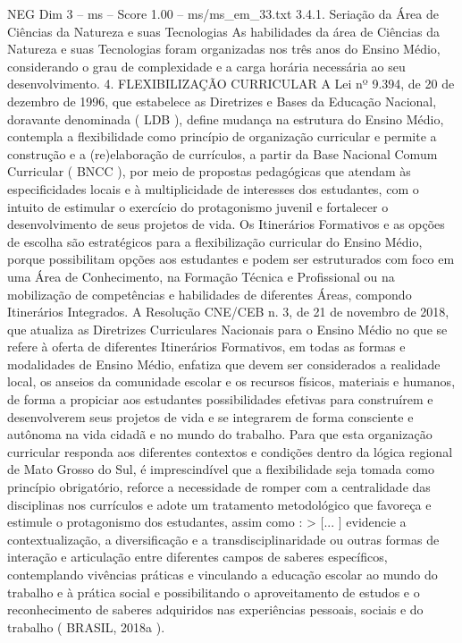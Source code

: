 \begin{textsample}{NEG Dim 3 – ms – Score 1.00 – ms/ms\_em\_33.txt}  \label{ex:f3_neg_096}
3.4.1.
Seriação da Área de Ciências da Natureza e suas Tecnologias As habilidades da área de Ciências da Natureza e suas Tecnologias foram organizadas nos três anos do Ensino Médio, considerando o grau de complexidade e a carga horária necessária ao seu desenvolvimento. 4.
FLEXIBILIZAÇÃO CURRICULAR A Lei nº 9.394, de 20 de dezembro de 1996, que estabelece as Diretrizes e Bases da Educação Nacional, doravante denominada ( LDB ), define mudança na estrutura do Ensino Médio, contempla a flexibilidade como princípio de organização curricular e permite a construção e a (re)elaboração de currículos, a partir da Base Nacional Comum Curricular ( BNCC ), por meio de propostas pedagógicas que atendam às especificidades locais e à multiplicidade de interesses dos estudantes, com o intuito de estimular o exercício do protagonismo juvenil e fortalecer o desenvolvimento de seus projetos de vida.
Os Itinerários Formativos e as opções de escolha são estratégicos para a flexibilização curricular do Ensino Médio, porque possibilitam opções aos estudantes e podem ser estruturados com foco em uma Área de Conhecimento, na Formação Técnica e Profissional ou na mobilização de competências e habilidades de diferentes Áreas, compondo Itinerários Integrados.
A Resolução CNE/CEB n. 3, de 21 de novembro de 2018, que atualiza as Diretrizes Curriculares Nacionais para o Ensino Médio no que se refere à oferta de diferentes Itinerários Formativos, em todas as formas e modalidades de Ensino Médio, enfatiza que devem ser considerados a realidade local, os anseios da comunidade escolar e os recursos físicos, materiais e humanos, de forma a propiciar aos estudantes possibilidades efetivas para construírem e desenvolverem seus projetos de vida e se integrarem de forma consciente e autônoma na vida cidadã e no mundo do trabalho.
Para que esta organização curricular responda aos diferentes contextos e condições dentro da lógica regional de Mato Grosso do Sul, é imprescindível que a flexibilidade seja tomada como princípio obrigatório, reforce a necessidade de romper com a centralidade das disciplinas nos currículos e adote um tratamento metodológico que favoreça e estimule o protagonismo dos estudantes, assim como : > [... ] evidencie a contextualização, a diversificação e a transdisciplinaridade ou outras formas de interação e articulação entre diferentes campos de saberes específicos, contemplando vivências práticas e vinculando a educação escolar ao mundo do trabalho e à prática social e possibilitando o aproveitamento de estudos e o reconhecimento de saberes adquiridos nas experiências pessoais, sociais e do trabalho ( BRASIL, 2018a ).

\end{textsample}
